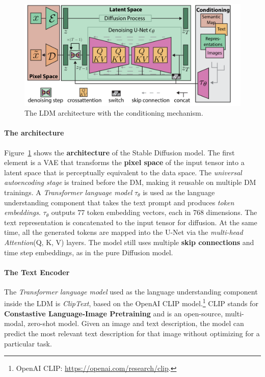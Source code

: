 \documentclass[preprint]{elsarticle}
\begin{document}
\begin{figure}[b]
	\centering
    \includegraphics[scale=0.9]{img/svg/SDArch.png}
	\caption{The LDM architecture with the conditioning mechanism.}\label{fig:ldm-architecture}
\end{figure}


\paragraph{The architecture}\label{sec:ldm-architecture} 




Figure~\ref{fig:ldm-architecture} shows the \textbf{architecture} of the Stable Diffusion model.
The first element is a VAE that transforms the \textbf{pixel space} of the input tensor into a latent space that is  perceptually equivalent to the data space. The \emph{universal autoencoding stage} is trained before the DM,  making it reusable on multiple DM trainings. A \emph{Transformer language model} $\tau_\theta$ is used as the language understanding component  that takes the text prompt and produces \emph{token embeddings}. $\tau_\theta$ outputs 77 token embedding vectors, each in 768 dimensions. 
The text representation is concatenated to the input tensor for diffusion. At the same time, all the generated tokens are mapped into the  U-Net via the \emph{multi-head Attention}(Q, K, V) layers. The model still uses multiple \textbf{skip connections} and time step embeddings,
as in the pure Diffusion model.



\paragraph{The Text Encoder}

The \emph{Transformer language model} used as the language understanding component inside the LDM is \emph{ClipText}, based on the OpenAI CLIP model.\footnote{OpenAI CLIP: \url{https://openai.com/research/clip}.}
CLIP stands for \textbf{Constastive Language-Image Pretraining} and is an open-source, multi-modal, zero-shot model. 
Given an image and text description, the model can predict the most relevant text description for that image without 
optimizing for a particular task.
\end{document}
